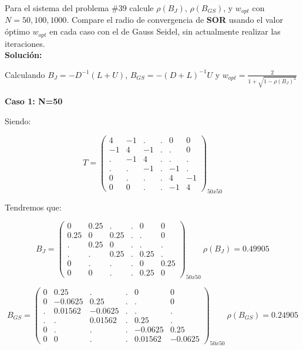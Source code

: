 Para el sistema del problema $\#39$ calcule $\rho(B_{J})$, $\rho(B_{GS})$, y $w_{opt}$ con $N=50,100,1000$. Compare el radio de convergencia de \textbf{SOR} usando el valor óptimo $w_{opt}$ en cada caso con el de Gauss Seidel, sin actualmente realizar las iteraciones.\\

\textbf{Solución:\\}

Calculando $B_{J} = -D^{-1}(L+U)$, $B_{GS} = -(D+L)^{-1}U$ y $w_{opt}=\frac{2}{1+\sqrt{1-\rho(B_{J})^{2}}}$

\textbf{Caso 1: N=50}

Siendo: 

$$
    T = \begin{pmatrix}
     4 &	-1 &	 . &	 . &	 0 &	 0 \\
    -1 &	 4 &	-1 &	 . &     . &	 0 \\
     . &	-1 &	 4 &	 . &	 . &	 . \\
     . &	 . &	-1 &	 . &	-1 &	 . \\
     0 &	 . &	 . &	 . &	 4 &	-1 \\
     0 &	 0 &	 . &	 . &	-1 &	 4
    \end{pmatrix}_{50x50}
$$

Tendremos que:

$$
    B_{J} = \begin{pmatrix}
     0 &  0.25 &	 . &	 . &	 0 &	 0 \\
  0.25 &	 0 &  0.25 &	 . &     . &	 0 \\
     . &  0.25 &	 0 &	 . &	 . &	 . \\
     . &	 . &  0.25 &	 . &  0.25 &	 . \\
     0 &	 . &	 . &	 . &	 0 &  0.25 \\
     0 &	 0 &	 . &	 . &  0.25 &	 0
    \end{pmatrix}_{50x50}\ \rho(B_{J}) = 0.49905
$$

$$
    B_{GS} = \begin{pmatrix}
     0 &	0.25 &	 . &	 . &	 0 &	 0 \\
     0 &	-0.0625 & 0.25 &	 . &     . &	 0 \\
     . &	0.01562 & -0.0625 &	 . &	 . &	 . \\
     . &	 . &	0.01562 &	 . &	0.25 &	 . \\
     0 &	 . &	 . &	 . &	 -0.0625 &	0.25 \\
     0 &	 0 &	 . &	 . &	0.01562 &	 -0.0625
    \end{pmatrix}_{50x50}\ \rho(B_{GS}) = 0.24905
$$

